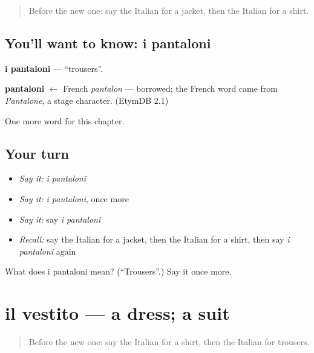 \label{lesson:IT-C105-pantaloni}



\begin{quote}
Before the new one: say the Italian for a jacket, then the Italian for a shirt.
\end{quote}

\subsection*{You'll want to know: i pantaloni}
\textbf{i pantaloni} — \textquotedblleft{}trousers\textquotedblright{}.

\begin{cousinweb}
\textbf{pantaloni} $\leftarrow$ French \emph{pantalon} — borrowed; the French word came from \emph{Pantalone}, a stage character. (EtymDB 2.1)
\end{cousinweb}

\begin{grammarlens}[title={What you've built}]
One more word for this chapter.
\end{grammarlens}

\subsection*{Your turn}
\begin{itemize}
\raggedright
  \item \emph{Say it:} \emph{i pantaloni}
  \item \emph{Say it:} \emph{i pantaloni}, once more
  \item \emph{Say it:} say \emph{i pantaloni}
  \item \emph{Recall:} say the Italian for a jacket, then the Italian for a shirt, then say \emph{i pantaloni} again
\end{itemize}

\begin{tcolorbox}[breakable,colback=teal!4,colframe=teal!35!black,title={Before you move on}]
What does i pantaloni mean? (\textquotedblleft{}Trousers\textquotedblright{}.) Say it once more.
\end{tcolorbox}
\section[il vestito]{il vestito — a dress; a suit}

\label{lesson:IT-C105-vestito}



\begin{quote}
Before the new one: say the Italian for a shirt, then the Italian for trousers.
\end{quote}

